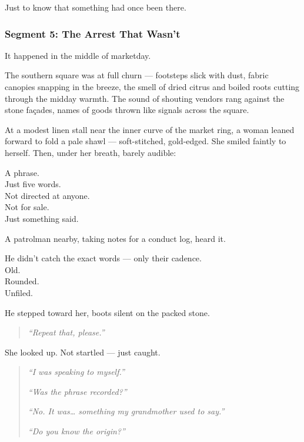 \documentclass[9pt]{article}
\begin{document}
Just to know that something had once been there.

\newpage

\subsubsection*{Segment 5: The Arrest That Wasn’t}

It happened in the middle of marketday.

The southern square was at full churn --- footsteps slick with dust, fabric canopies snapping in the breeze, the smell of dried citrus and boiled roots cutting through the midday warmth. The sound of shouting vendors rang against the stone façades, names of goods thrown like signals across the square.

At a modest linen stall near the inner curve of the market ring, a woman leaned forward to fold a pale shawl --- soft-stitched, gold-edged. She smiled faintly to herself. Then, under her breath, barely audible:

A phrase.\\
Just five words.\\
Not directed at anyone.\\
Not for sale.\\
Just something said.

A patrolman nearby, taking notes for a conduct log, heard it.

He didn’t catch the exact words --- only their cadence.\\
Old.\\
Rounded.\\
Unfiled.

\vspace{1em}

He stepped toward her, boots silent on the packed stone.

\begin{quote}
\textit{“Repeat that, please.”}
\end{quote}

She looked up. Not startled --- just caught.

\begin{quote}
\textit{“I was speaking to myself.”}

\textit{“Was the phrase recorded?”}

\textit{“No. It was… something my grandmother used to say.”}

\textit{“Do you know the origin?”}
\end{quote}
\end{document}
